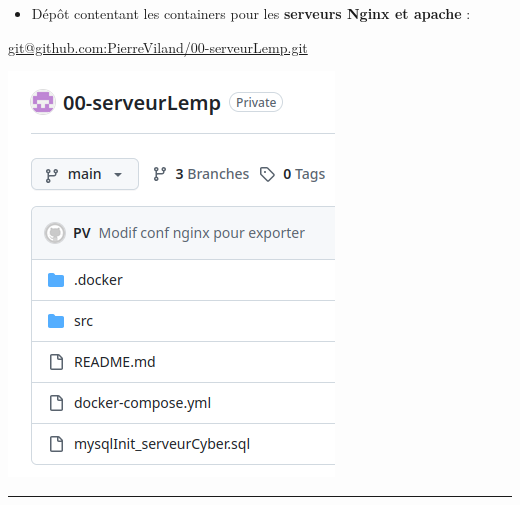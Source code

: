 \documentclass[french, 12pt]{article}%
\newcommand{\itemE}{\item[$\bullet$]}
\begin{document}
\begin{minipage}{0.6\linewidth}
\begin{itemize}
\itemE Dépôt contentant les containers pour les \textbf{serveurs Nginx et apache} : 
\end{itemize}
\href{git@github.com:PierreViland/00-serveurLemp.git}{git@github.com:PierreViland/00-serveurLemp.git}
\end{minipage}
\begin{minipage}{0.39\linewidth}
\begin{center}
\includegraphics[scale=0.5]{./ressource/depotserveurGlobal}
\end{center}
\end{minipage}

\begin{center}
 \rule{0.75\linewidth}{1pt}
 \end{center}
\end{document}

